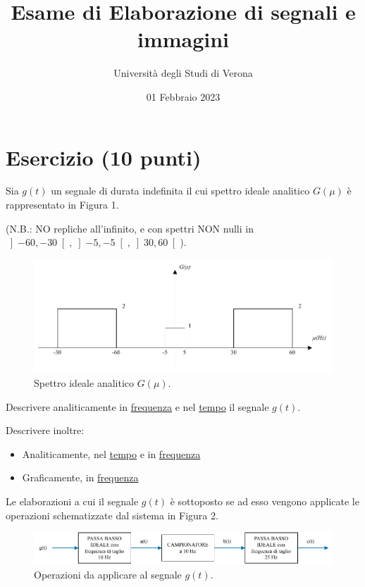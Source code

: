 \documentclass[a4paper]{article}
\begin{document}
	\author{Università degli Studi di Verona}
	\title{Esame di Elaborazione di segnali e immagini}
	\date{{\Large 01 Febbraio 2023}}
	\maketitle

	\section{Esercizio (10 punti)}
	
	Sia $g\left(t\right)$ un segnale di durata indefinita il cui spettro ideale analitico $G\left(\mu\right)$ è rappresentato in Figura 1.\newline
	
	\noindent
	(N.B.: NO repliche all'infinito, e con spettri NON nulli in $\left]-60,-30\right[, \left]-5,-5\right[, \left]30,60\right[$).
	
	\begin{figure}[!htp]
		\centering
		\includegraphics[width=\textwidth]{img/fig_1.pdf}
		\caption{Spettro ideale analitico $G\left(\mu\right)$.}
	\end{figure}

	\noindent
	Descrivere analiticamente in \underline{frequenza} e nel \underline{tempo} il segnale $g\left(t\right)$.\newline
	
	\noindent
	Descrivere inoltre:
	\begin{itemize}
		\item Analiticamente, nel \underline{tempo} e in \underline{frequenza}
		\item Graficamente, in \underline{frequenza}
	\end{itemize}
	Le elaborazioni a cui il segnale $g\left(t\right)$ è sottoposto se ad esso vengono applicate le operazioni schematizzate dal sistema in Figura 2.
	
	\begin{figure}[!htp]
		\centering
		\includegraphics[width=\textwidth]{img/fig_2.pdf}
		\caption{Operazioni da applicare al segnale $g\left(t\right)$.}
	\end{figure}
	
\end{document}
